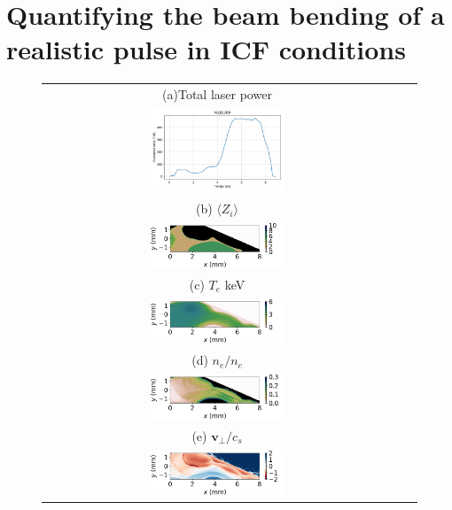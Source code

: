 \documentclass[%
 reprint,
 amsmath,amssymb,
 aps,
]{revtex4-1}
\begin{document}
\section{Quantifying the beam bending of a  realistic pulse in  ICF conditions}
\label{sec:icf}
\begin{figure}
\begin{tabular}{ccc}
(a)Total laser power \\
\includegraphics[width=0.4\textwidth]{Plasertotale.pdf}\\
 (b) $\langle Z_i\rangle $\\
\includegraphics[width=0.4\textwidth]{ZFCI2bb_6ns.png}\\
(c) $T_e$ keV\\
\includegraphics[width=0.4\textwidth]{Te6ns.png}\\
(d) $n_e/n_c$\\
\includegraphics[width=0.4\textwidth]{ne6ns.png} \\
(e) $\mathbf{v}_\perp /c_s$\\
\includegraphics[width=0.4\textwidth]{Fig4e.png} %

\end{tabular}
\end{figure}
\end{document}
